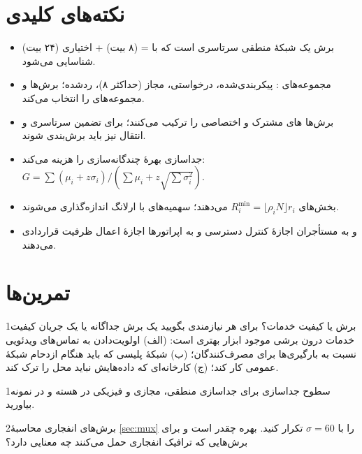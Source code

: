 \documentclass[11pt,a4paper]{article}
\begin{document}
\section{نکته‌های کلیدی}
\begin{takeawaybox}
\begin{itemize}
  \item برش یک شبکهٔ منطقی سرتاسری است که با  =  (۸ بیت) +  اختیاری (۲۴ بیت) شناسایی می‌شود.
  \item مجموعه‌های : پیکربندی‌شده، درخواستی، مجاز (حداکثر ۸)، ردشده؛  برش‌ها و مجموعه‌های  را انتخاب می‌کند.
  \item برش‌ها های مشترک و اختصاصی را ترکیب می‌کنند؛ برای تضمین سرتاسری  و انتقال نیز باید برش‌بندی شوند.
  \item جداسازی بهرهٔ چندگانه‌سازی را هزینه می‌کند: $G = \sum(\mu_i + z\sigma_i)/(\sum\mu_i + z\sqrt{\sum\sigma_i^2})$.
  \item بخش‌های  $R_i^{\min} = \lfloor\rho_i N\rfloor r_i$ می‌دهند؛ سهمیه‌های  با ارلانگ  اندازه‌گذاری می‌شوند.
  \item {} و  به مستأجران اجازهٔ کنترل دسترسی و به اپراتورها اجازهٔ اعمال ظرفیت قراردادی می‌دهند.
\end{itemize}
\end{takeawaybox}

\section{تمرین‌ها}

\begin{exercisebox}{1}{برش یا کیفیت خدمات؟}\label{exr:slqos}
برای هر نیازمندی بگویید یک برش جداگانه یا یک جریان کیفیت خدمات درون برشی موجود ابزار بهتری است: (الف) اولویت‌دادن به تماس‌های ویدئویی
نسبت به بارگیری‌ها برای مصرف‌کنندگان؛ (ب) شبکهٔ پلیسی که باید هنگام ازدحام شبکهٔ عمومی کار کند؛ (ج) کارخانه‌ای که داده‌هایش نباید
محل را ترک کند.
\end{exercisebox}

\begin{exercisebox}{1}{سطوح جداسازی}\label{exr:iso}
برای جداسازی منطقی، مجازی و فیزیکی در هسته و در  نمونه بیاورید.
\end{exercisebox}

\begin{exercisebox}{2}{برش‌های انفجاری}\label{exr:gain}
محاسبهٔ \cref{sec:mux} را با $\sigma = 60$ تکرار کنید. بهره چقدر است و برای برش‌هایی که ترافیک انفجاری حمل می‌کنند چه معنایی دارد؟
\end{exercisebox}
\end{document}
